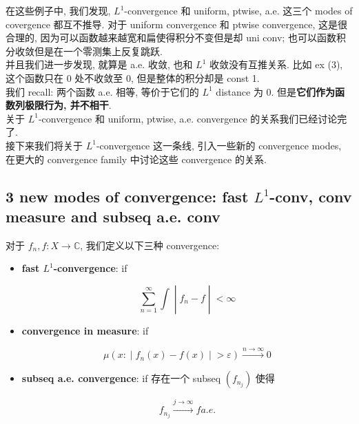 在这些例子中, 我们发现, \(L^{1}\)-convergence 和 uniform, ptwise, a.e. 这三个 modes of covergence 都互不推导. 对于 uniform convergence 和 ptwise convergence, 这是很合理的, 因为可以函数越来越宽和扁使得积分不变但是却 uni conv; 也可以函数积分收敛但是在一个零测集上反复跳跃.\\
并且我们进一步发现, 就算是 a.e. 收敛, 也和 \(L^{1}\) 收敛没有互推关系. 比如 ex (3), 这个函数只在 \(0\) 处不收敛至 0, 但是整体的积分却是 const 1.\\
我们 recall: 两个函数 a.e. 相等, 等价于它们的 \(L^{1}\) distance 为 0. 但是\textbf{它们作为函数列极限行为, 并不相干}.\\
关于 \(L^{1}\)-convergence 和 uniform, ptwise, a.e. convergence 的关系我们已经讨论完了.\\
接下来我们将关于 \(L^{1}\)-convergence 这一条线, 引入一些新的 convergence modes, 在更大的 convergence family 中讨论这些 convergence 的关系.

\subsection{\texorpdfstring{3 new modes of convergence: fast \(L^{1}\)-conv, conv measure and subseq a.e. conv}{3 new modes of convergence: fast L\^{}\{1\}-conv, conv measure and subseq a.e. conv}}\label{new-modes-of-convergence-fast-l1-conv-conv-measure-and-subseq-a.e.-conv}

\begin{definition}{}

对于 \(f_{n},f:X\rightarrow\mathbb{C}\), 我们定义以下三种 convergence:

\begin{itemize}
\item
  \textbf{fast \(L^{1}\)-convergence}: if

  \[\left. \sum\limits_{n = 1}^{\infty}\int \middle| f_{n} - f \middle| < \infty \right.\]
\item
  \textbf{convergence in measure}: if

  \[\left. \mu(x: \middle| f_{n}(x) - f(x) \middle| > \varepsilon)\overset{n\rightarrow\infty}{\rightarrow}0 \right.\]
\item
  \textbf{subseq a.e. convergence}: if 存在一个 subseq \((f_{n_{j}})\) 使得

  \[f_{n_{j}}\overset{j\rightarrow\infty}{\rightarrow}f a.e.\]
\end{itemize}

\end{definition}


